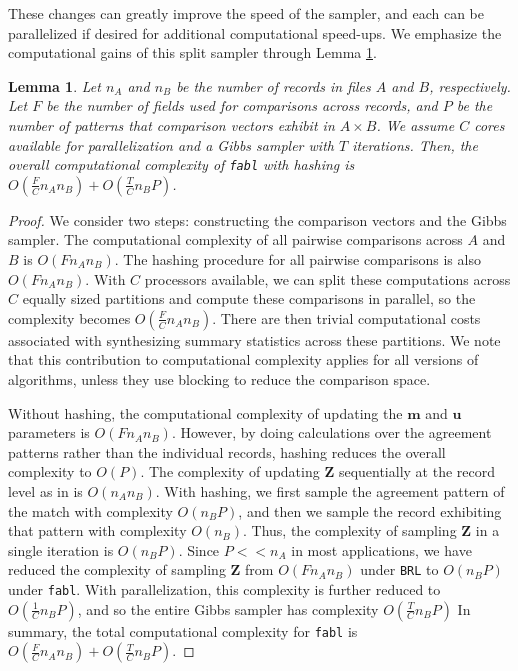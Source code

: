 \documentclass[ba]{imsart}
\newtheorem{lemma}{Lemma}
\begin{document}
These changes can greatly improve the speed of the sampler, and each can be parallelized if desired for additional computational speed-ups. We emphasize the computational gains of this split sampler through Lemma \ref{lemma:fabl}.

\begin{lemma}
	Let $n_A$ and $n_B$ be the number of records in files $A$ and $B$, respectively. Let $F$ be the number of fields used for comparisons across records, and $P$ be the number of patterns that comparison vectors exhibit in $A \times B$. We assume $C$ cores available for parallelization and a Gibbs sampler with $T$ iterations. Then, the overall computational complexity of \texttt{fabl} with hashing is $O(\frac{F}{C} n_A n_B) + O(\frac{T}{C}n_B P)$.
	\label{lemma:fabl}
\end{lemma}
\begin{proof}
	We consider two steps: constructing the comparison vectors and the Gibbs sampler. The computational complexity of all pairwise comparisons across $A$ and $B$ is $O(F n_A n_B)$. The hashing procedure for all pairwise comparisons is also $O(F n_A n_B)$. With $C$ processors available, we can split these computations across $C$ equally sized partitions and compute these comparisons in parallel, so the complexity becomes $O(\frac{F}{C} n_A n_B)$. There are then trivial computational costs associated with synthesizing summary statistics across these partitions. We note that this contribution to computational complexity applies for all versions of \cite{fellegi_theory_1969} algorithms, unless they use blocking to reduce the comparison space.
	
	Without hashing, the computational complexity of updating the $\bm{m}$ and $\bm{u}$ parameters is $O(F n_A n_B)$. However, by doing calculations over the agreement patterns rather than the individual records, hashing reduces the overall complexity to $O(P)$. The complexity of updating $\bm{Z}$ sequentially at the record level as in \cite{sadinle_bayesian_2017} is $O(n_A n_B)$. With hashing, we first sample the agreement pattern of the match with complexity $O(n_B P)$, and then we sample the record exhibiting that pattern with complexity $O(n_B)$. Thus, the complexity of sampling $\bm{Z}$ in a single iteration is $O(n_B P)$. Since $P << n_A$ in most applications, we have reduced the complexity of sampling $\bm{Z}$ from $O(F n_A n_B)$ under \texttt{BRL} to $O(n_B P)$ under \texttt{fabl}. With parallelization, this complexity is further reduced to $O(\frac{1}{C}n_B P)$, and so the entire Gibbs sampler has complexity $O(\frac{T}{C}n_B P)$
	In summary, the total computational complexity for \texttt{fabl} is $O(\frac{F}{C} n_A n_B) + O(\frac{T}{C}n_B P).$
\end{proof} 
\end{document}
